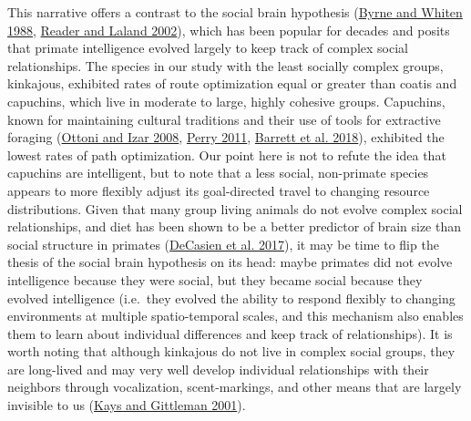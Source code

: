 \documentclass[twoside,12pt,final]{ucthesis-CA2012}
\begin{document}
\begin{ucmainmatter}
This narrative offers a contrast to the social brain hypothesis (\protect\hyperlink{ref-byrne1988}{Byrne and Whiten 1988}, \protect\hyperlink{ref-reader2002}{Reader and Laland 2002}), which has been popular for decades and posits that primate intelligence evolved largely to keep track of complex social relationships. The species in our study with the least socially complex groups, kinkajous, exhibited rates of route optimization equal or greater than coatis and capuchins, which live in moderate to large, highly cohesive groups. Capuchins, known for maintaining cultural traditions and their use of tools for extractive foraging (\protect\hyperlink{ref-ottoni2008}{Ottoni and Izar 2008}, \protect\hyperlink{ref-perry2011}{Perry 2011}, \protect\hyperlink{ref-barrett2018}{Barrett et al. 2018}), exhibited the lowest rates of path optimization. Our point here is not to refute the idea that capuchins are intelligent, but to note that a less social, non-primate species appears to more flexibly adjust its goal-directed travel to changing resource distributions. Given that many group living animals do not evolve complex social relationships, and diet has been shown to be a better predictor of brain size than social structure in primates (\protect\hyperlink{ref-decasien2017}{DeCasien et al. 2017}), it may be time to flip the thesis of the social brain hypothesis on its head: maybe primates did not evolve intelligence because they were social, but they became social because they evolved intelligence (i.e.~they evolved the ability to respond flexibly to changing environments at multiple spatio-temporal scales, and this mechanism also enables them to learn about individual differences and keep track of relationships). It is worth noting that although kinkajous do not live in complex social groups, they are long-lived and may very well develop individual relationships with their neighbors through vocalization, scent-markings, and other means that are largely invisible to us (\protect\hyperlink{ref-kays2001}{Kays and Gittleman 2001}).


\end{ucmainmatter}
\end{document}
